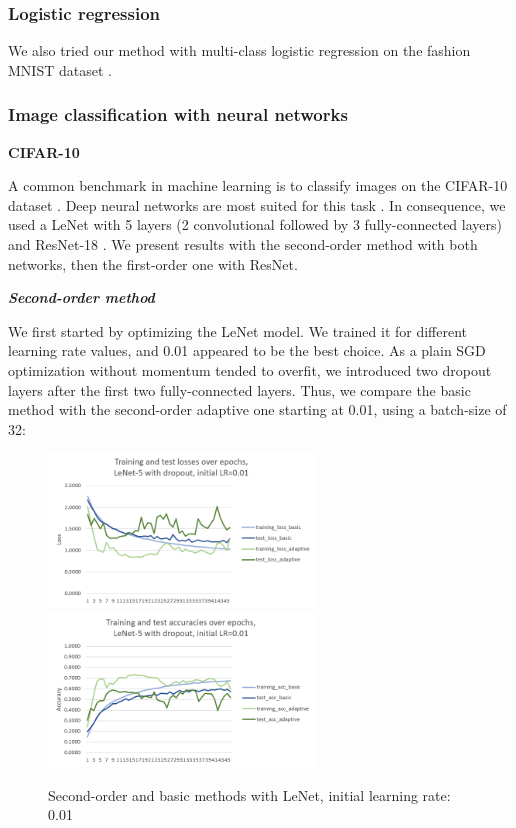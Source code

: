 \documentclass{article}
\begin{document}
  
  \subsubsection{Logistic regression}
  
  We also tried our method with multi-class logistic regression on the fashion MNIST dataset \cite{xiao2017fashion}. 

  \subsubsection{Image classification with neural networks}
  
  \textbf{CIFAR-10}
  
  A common benchmark in machine learning is to classify images on the CIFAR-10 dataset \cite{cifar}. Deep neural networks are most suited for this task \cite{krizhevsky2012imagenet}. In consequence, we used a LeNet with 5 layers (2 convolutional followed by 3 fully-connected layers) and ResNet-18 \cite{he2016deep}. We present results with the second-order method with both networks, then the first-order one with ResNet.
  
  \emph{\textbf{Second-order method}}
  
  We first started by optimizing the LeNet model. We trained it for different learning rate values, and 0.01 appeared to be the best choice. As a plain SGD optimization without momentum tended to overfit, we introduced two dropout layers after the first two fully-connected layers. Thus, we compare the basic method with the second-order adaptive one starting at 0.01, using a batch-size of 32:\\
  
  \begin{figure}[!h]
  	\includegraphics[width=200pt]{loss_lenet_d_0_01.png}
  	\includegraphics[width=200pt]{acc_lenet_d_0_01.png}
  	\caption{Second-order and basic methods with LeNet, initial learning rate: 0.01}
  \end{figure}
\end{document}
